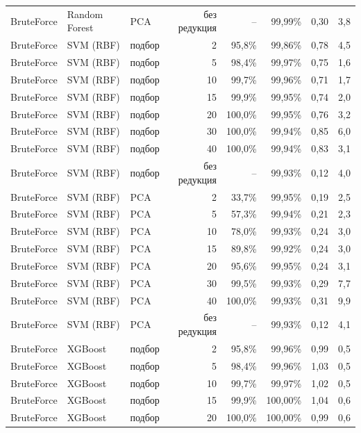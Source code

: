{\begin{tabular}{@{}lllrrrrr@{}}
\rowcolor{rowalt}BruteForce & Random Forest & PCA & без редукция & -- & 99,99\% & 0,30 & 3,8\\
BruteForce & SVM (RBF) & подбор & 2 & 95,8\% & 99,86\% & 0,78 & 4,5\\
\rowcolor{rowalt}BruteForce & SVM (RBF) & подбор & 5 & 98,4\% & 99,97\% & 0,75 & 1,6\\
BruteForce & SVM (RBF) & подбор & 10 & 99,7\% & 99,96\% & 0,71 & 1,7\\
\rowcolor{rowalt}BruteForce & SVM (RBF) & подбор & 15 & 99,9\% & 99,95\% & 0,74 & 2,0\\
BruteForce & SVM (RBF) & подбор & 20 & 100,0\% & 99,95\% & 0,76 & 3,2\\
\rowcolor{rowalt}BruteForce & SVM (RBF) & подбор & 30 & 100,0\% & 99,94\% & 0,85 & 6,0\\
BruteForce & SVM (RBF) & подбор & 40 & 100,0\% & 99,94\% & 0,83 & 3,1\\
\rowcolor{rowalt}BruteForce & SVM (RBF) & подбор & без редукция & -- & 99,93\% & 0,12 & 4,0\\
BruteForce & SVM (RBF) & PCA & 2 & 33,7\% & 99,95\% & 0,19 & 2,5\\
\rowcolor{rowalt}BruteForce & SVM (RBF) & PCA & 5 & 57,3\% & 99,94\% & 0,21 & 2,3\\
BruteForce & SVM (RBF) & PCA & 10 & 78,0\% & 99,93\% & 0,24 & 3,0\\
\rowcolor{rowalt}BruteForce & SVM (RBF) & PCA & 15 & 89,8\% & 99,92\% & 0,24 & 3,0\\
BruteForce & SVM (RBF) & PCA & 20 & 95,6\% & 99,95\% & 0,24 & 3,1\\
\rowcolor{rowalt}BruteForce & SVM (RBF) & PCA & 30 & 99,5\% & 99,93\% & 0,29 & 7,7\\
BruteForce & SVM (RBF) & PCA & 40 & 100,0\% & 99,93\% & 0,31 & 9,9\\
\rowcolor{rowalt}BruteForce & SVM (RBF) & PCA & без редукция & -- & 99,93\% & 0,12 & 4,1\\
BruteForce & XGBoost & подбор & 2 & 95,8\% & 99,96\% & 0,99 & 0,5\\
\rowcolor{rowalt}BruteForce & XGBoost & подбор & 5 & 98,4\% & 99,96\% & 1,03 & 0,5\\
BruteForce & XGBoost & подбор & 10 & 99,7\% & 99,97\% & 1,02 & 0,5\\
\rowcolor{rowalt}BruteForce & XGBoost & подбор & 15 & 99,9\% & 100,00\% & 1,04 & 0,6\\
BruteForce & XGBoost & подбор & 20 & 100,0\% & 100,00\% & 0,99 & 0,6\\

\end{tabular}}
